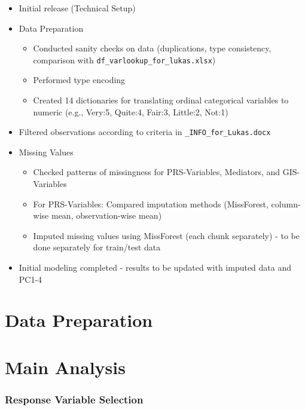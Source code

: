 \documentclass[
  letterpaper,
  DIV=11,
  numbers=noendperiod]{scrartcl}
\providecommand{\tightlist}{%
  \setlength{\itemsep}{0pt}\setlength{\parskip}{0pt}}\usepackage{longtable,booktabs,array}
\begin{document}
\begin{itemize}
\tightlist
\item
  Initial release (Technical Setup)
\item
  Data Preparation

  \begin{itemize}
  \tightlist
  \item
    Conducted sanity checks on data (duplications, type consistency,
    comparison with \texttt{df\_varlookup\_for\_lukas.xlsx})
  \item
    Performed type encoding
  \item
    Created 14 dictionaries for translating ordinal categorical
    variables to numeric (e.g., Very:5, Quite:4, Fair:3, Little:2,
    Not:1)
  \end{itemize}
\item
  Filtered observations according to criteria in
  \texttt{\_INFO\_for\_Lukas.docx}
\item
  Missing Values

  \begin{itemize}
  \tightlist
  \item
    Checked patterns of missingness for PRS-Variables, Mediators, and
    GIS-Variables
  \item
    For PRS-Variables: Compared imputation methods (MissForest,
    column-wise mean, observation-wise mean)
  \item
    Imputed missing values using MissForest (each chunk separately) - to
    be done separately for train/test data
  \end{itemize}
\item
  Initial modeling completed - results to be updated with imputed data
  and PC1-4
\end{itemize}

\section{Data Preparation}\label{data-preparation}

\section{Main Analysis}\label{main-analysis}

\subsubsection{Response Variable
Selection}\label{response-variable-selection}
\end{document}
